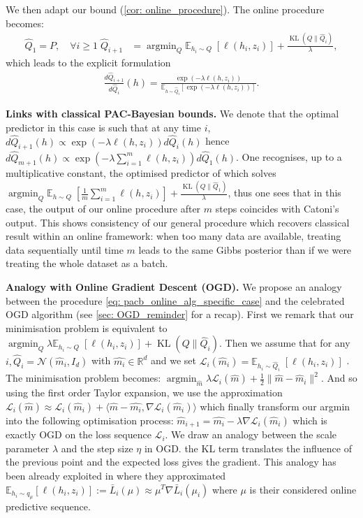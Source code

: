 We then adapt our \OPBTrain bound (\cref{cor: online_procedure}). The online procedure becomes:
\begin{align}
  \label{eq: pacb_online_alg_specific_case}
  \hat{Q}_1= P, \quad \forall i\geq1\; \hat{Q}_{i+1}&= \operatorname{argmin}_{Q} \mathbb{E}_{h_i\sim Q} \; [\ell(h_i,z_i)] + \frac{\operatorname{KL}(Q\| \hat{Q}_{i})}{\lambda},
\end{align}
which leads to the explicit formulation
\begin{align*}
  \frac{d\hat{Q}_{i+1}}{d\hat{Q}_{i}}(h) = \frac{\exp\left(-\lambda \ell(h,z_i)\right)}{\mathbb{E}_{h\sim \hat{Q}_{i}}\left[\exp\left(-\lambda \ell(h,z_i)\right)\right]}.
\end{align*}

\textbf{Links with classical PAC-Bayesian bounds.} We denote that the optimal predictor in this case is such that at any time $i$, $d\hat{Q}_{i+1}(h) \propto \exp(-\lambda\ell(h,z_i))d\hat{Q}_i(h) $ hence $d\hat{Q}_{m+1}(h) \propto \exp\left(-\lambda\sum_{i=1}^m\ell(h,z_i)\right)d\hat{Q}_1(h) $.
One recognises, up to a multiplicative constant, the optimised predictor of \citet[][Th 1.2.6]{catoni2007pac} which solves
$\operatorname{argmin}_{Q} \mathbb{E}_{h\sim Q} \; [\frac{1}{m}\sum_{i=1}^m\ell(h,z_i)] + \frac{\operatorname{KL}(Q\| \hat{Q}_{1})}{\lambda}$, thus one sees that in this case, the output of our online procedure after $m$ steps coincides with Catoni's output. This shows consistency of our general procedure which recovers classical result within an online framework: when too many data are available, treating data sequentially until time $m$ leads to the same Gibbs posterior than if we were treating the whole dataset as a batch.


\textbf{Analogy with Online Gradient Descent (OGD).} We propose an analogy between the procedure \cref{eq: pacb_online_alg_specific_case} and the celebrated OGD algorithm (see \cref{sec: OGD_reminder} for a recap). First we remark that our minimisation problem is equivalent to
$\operatorname{argmin}_{Q} \lambda\mathbb{E}_{h_i\sim Q} \; [\ell(h_i,z_i)] + \operatorname{KL}(Q\| \hat{Q}_{i})$.
Then we assume that for any $i, \hat{Q}_i=\mathcal{N}(\hat{m}_i,I_d)$ with $\hat{m_i}\in\mathbb{R}^d$  and we set $\mathcal{L}_i(\hat{m}_i)= \mathbb{E}_{h_i\sim \hat{Q}_i} \; [\ell(h_i,z_i)] $ .
The minimisation problem becomes: $\operatorname{argmin}_{\hat{m}} \lambda\mathcal{L}_i(\hat{m}) + \frac{1}{2} \| \hat{m} - \hat{m}_i \|^2$.
And so using the first order Taylor expansion, we use the approximation $ \mathcal{L}_i(\hat{m}) \approx \mathcal{L}_i(\hat{m}_i ) + \langle \hat{m}- \hat{m_i}, \nabla \mathcal{L}_i(\hat{m}_i) \rangle $ which finally transform our argmin into the following optimisation process: $\hat{m}_{i+1} = \hat{m_i} - \lambda \nabla \mathcal{L}_i(\hat{m}_i)$ which is exactly OGD on the loss sequence $\mathcal{L}_i$.
We draw an analogy between the scale parameter $\lambda$ and the step size $\eta$ in OGD. the KL term translates the influence of the previous point and the expected loss gives the gradient.
This analogy has been already exploited in \citet{shalev2012online} where they approximated $\mathbb{E}_{h_i\sim q_\mu} [\ell(h_i,z_i)]:= \bar{L}_i(\mu) \approx \mu^T\nabla \bar{L}_i(\mu_i)$ where $\mu$ is their considered online predictive sequence.

